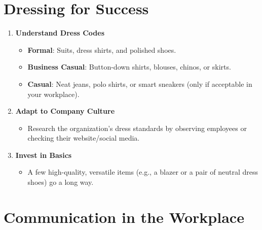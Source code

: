 \documentclass[
  letterpaper,
  DIV=11,
  numbers=noendperiod]{scrreprt}
\providecommand{\tightlist}{%
  \setlength{\itemsep}{0pt}\setlength{\parskip}{0pt}}\usepackage{longtable,booktabs,array}
\begin{document}
\section{Dressing for Success}\label{dressing-for-success}

\begin{enumerate}
\def\labelenumi{\arabic{enumi}.}
\item
  \textbf{Understand Dress Codes}

  \begin{itemize}
  \tightlist
  \item
    \textbf{Formal}: Suits, dress shirts, and polished shoes.
  \item
    \textbf{Business Casual}: Button-down shirts, blouses, chinos, or
    skirts.
  \item
    \textbf{Casual}: Neat jeans, polo shirts, or smart sneakers (only if
    acceptable in your workplace).
  \end{itemize}
\item
  \textbf{Adapt to Company Culture}

  \begin{itemize}
  \tightlist
  \item
    Research the organization's dress standards by observing employees
    or checking their website/social media.
  \end{itemize}
\item
  \textbf{Invest in Basics}

  \begin{itemize}
  \tightlist
  \item
    A few high-quality, versatile items (e.g., a blazer or a pair of
    neutral dress shoes) go a long way.
  \end{itemize}
\end{enumerate}

\section{Communication in the
Workplace}\label{communication-in-the-workplace}
\end{document}
